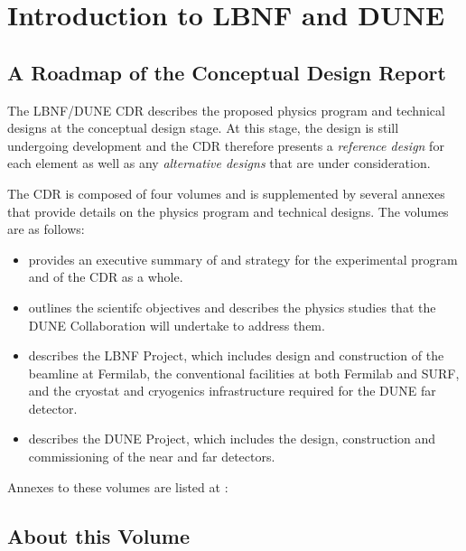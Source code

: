 

\chapter{Introduction to LBNF and DUNE}
\label{ch:project-overview}

%


\section{A Roadmap of the Conceptual Design Report}

The LBNF/DUNE CDR describes the proposed physics program and 
technical designs at the conceptual design stage.  At this stage, the design is
still undergoing development and the CDR therefore presents a \textit{reference design} for each element as well as any 
\textit{alternative designs} that are under consideration.

The CDR is composed of four volumes and is supplemented
by several annexes that provide details on the physics program and technical designs. The volumes are as follows:

\begin{itemize}
\item \volintro provides an executive summary of and strategy for the experimental program and of the CDR as a whole.
\item \volphys outlines the scientifc objectives and describes the physics studies that the DUNE Collaboration will undertake to address them.
\item \vollbnf describes the LBNF Project, which includes design and construction of the beamline at Fermilab, the conventional facilities at both Fermilab and SURF, and the cryostat and cryogenics infrastructure required for the DUNE far detector.
\item \voldune describes the DUNE Project, which includes the design, construction and commissioning of the near and far detectors. 
\end{itemize}
Annexes to these volumes are listed at :



\section{About this Volume}

